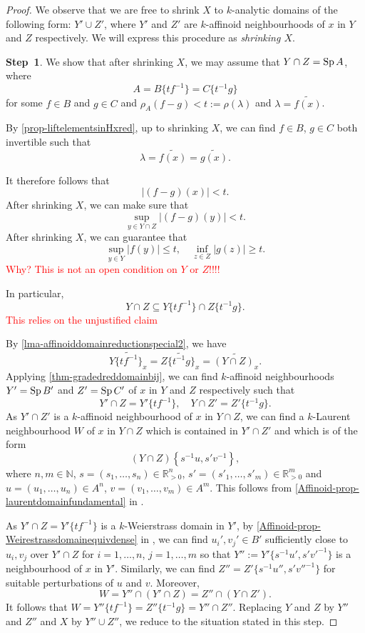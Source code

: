 \begin{proof}
    We observe that we are free to shrink $X$ to $k$-analytic domains of the following form: $Y'\cup Z'$, where $Y'$ and $Z'$ are $k$-affinoid neighbourhoods of $x$ in $Y$ and $Z$ respectively. We will express this procedure as \emph{shrinking $X$}.

    \textbf{Step~1}. We show that after shrinking $X$, we may assume that $Y\cap Z=\operatorname{Sp} A$, where
    \[
        A=B\{tf^{-1}\}=C\{t^{-1}g\}  
    \]
    for some $f\in B$ and $g\in C$ and $\rho_A(f-g)<t:=\rho(\lambda)$ and $\lambda=\widetilde{f(x)}$.



    By \cref{prop-liftelementsinHxred}, up to shrinking $X$, we can find $f\in B$, $g\in C$ both invertible such that 
    \[
        \lambda=\widetilde{f(x)}=\widetilde{g(x)}.
    \]
     

    It therefore follows that 
    \[
        |(f-g)(x)|<t.  
    \] 
    After shrinking $X$, we can make sure that 
    \[
        \sup_{y\in Y\cap Z}|(f-g)(y)|<t.
    \]
    After shrinking $X$, we can guarantee that
    \[
        \sup_{y\in Y} |f(y)|\leq t,\quad \inf_{z\in Z}|g(z)|\geq t.
    \]
     \textcolor{red}{Why? This is not an open condition on $Y$ or $Z$!!!!}  
    
    In particular,
    \[  
        Y\cap Z\subseteq Y\{tf^{-1}\}\cap Z\{t^{-1}g\}.
    \]
    \textcolor{red}{This relies on the unjustified claim}

    By \cref{lma-affinoiddomainreductionspecial2}, we have
    \[
        \widetilde{Y\{tf^{-1}\}_x}= \widetilde{Z\{t^{-1}g\}_x}= \widetilde{(Y\cap Z)_x}.
    \]
    Applying \cref{thm-gradedreddomainbij}, we can find $k$-affinoid neighbourhoods $Y'=\operatorname{Sp} B'$ and $Z'=\operatorname{Sp} C'$ of $x$ in $Y$ and $Z$ respectively such that
    \[
        Y'\cap Z=Y'\{tf^{-1}\},\quad Y\cap Z'=Z'\{t^{-1}g\}. 
    \]
    As $Y'\cap Z'$ is a $k$-affinoid neighbourhood of $x$ in $Y\cap Z$, we can find a $k$-Laurent neighbourhood $W$ of $x$ in $Y\cap Z$ which is contained in $Y'\cap Z'$ and which is of the form
    \[
        (Y\cap Z)\left\{s^{-1}u,s'v^{-1}\right\},  
    \]
    where $n,m\in \mathbb{N}$, $s=(s_1,\ldots,s_n)\in \mathbb{R}_{>0}^n$, $s'=(s'_1,\ldots,s'_m)\in \mathbb{R}_{>0}^m$ and $u=(u_1,\ldots,u_n)\in A^n$, $v=(v_1,\ldots,v_m)\in A^m$. This follows from \cref{Affinoid-prop-laurentdomainfundamental} in .


    As $Y'\cap Z=Y'\{tf^{-1}\}$ is a $k$-Weierstrass domain in $Y'$, by \cref{Affinoid-prop-Weirestrassdomainequivdense} in ,
    we can find $u_i',v_j'\in B'$ sufficiently close to $u_i,v_j$ over $Y'\cap Z$ for $i=1,\dots,n$, $j=1,\ldots,m$ so that $Y'':=Y'\{s^{-1}u',s'v'^{-1}\}$ is a neighbourhood of $x$ in $Y'$. Similarly, we can find $Z''=Z'\{s^{-1}u'',s'v''^{-1}\}$ for suitable perturbations of $u$ and $v$. Moreover,
    \[
        W=Y''\cap (Y'\cap Z)=Z''\cap (Y\cap Z').  
    \]
    It follows that $W=Y''\{tf^{-1}\}=Z''\{t^{-1}g\}=Y''\cap Z''$. Replacing $Y$ and $Z$ by $Y''$ and $Z''$ and $X$ by $Y''\cup Z''$, we reduce to the situation stated in this step.



\end{proof}
